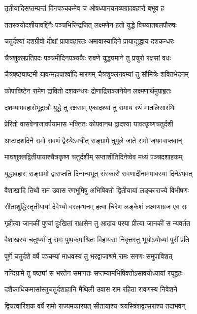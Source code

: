 \twolineshloka
{तृतीयादिसप्तम्यन्तं दिनपञ्चकमेव च}
{ओषध्यानयनव्यग्रादवहारो बभूव ह}%

\twolineshloka
{ततस्त्रयोदशीयावद्दिनैः पञ्चभिरिन्द्रजित्}
{लक्ष्मणेन हतो युद्धे विख्यातबलपौरुषः}%

\twolineshloka
{चतुर्दश्यां दशग्रीवो दीक्षां प्रापावहारतः}
{अमावास्यादिने प्रायाद्युद्धाय दशकन्धरः}%

\twolineshloka
{चैत्रशुक्लप्रतिपदः पञ्चमीदिनपञ्चकैः}
{रावणे युद्ध्यमाने तु प्रचुरो रक्षसां वधः}%

\twolineshloka
{चैत्रषष्ठ्याष्टमी यावन्महापार्श्वादि मारणम्}
{चैत्रशुक्लनवम्यां तु सौमित्रेः शक्तिभेदनम्}%

\twolineshloka
{कोपाविष्टेन रामेण द्रावितो दशकन्धरः}
{द्रोणाद्रिराञ्जनेयेन लक्ष्मणार्थमुपाहृतः}%

\twolineshloka
{दशम्यामवहारोभूद्रात्रौ युद्धे तु रक्षसाम्}
{एकादश्यां तु रामाय रथं मातलिसारथिः}%

\twolineshloka
{प्रेरितो वासवेनाजावर्पयामास भक्तितः}
{कोपवानथ द्वादश्या यावत्कृष्णचतुर्दशी}%

\twolineshloka
{अष्टादशदिनै रामो रावणं द्वैरथेऽवधीत्}
{सङ्ग्रामे तुमुले जाते रामो जयमवाप्तवान्}%

\twolineshloka
{माघशुक्लद्वितीयायाश्चैत्रकृष्ण चतुर्दशीम्}
{सप्ताशीतिदिनेष्वेव मध्यं पञ्चदशाहकम्}%

\twolineshloka
{युद्धावहारः सङ्ग्रामो द्वासप्तति दिनान्यभूत्}
{संस्कारो रावणादीनाममावस्या दिनेऽभवत्}%

\twolineshloka
{वैशाखादि तिथौ राम उवास रणभूमिषु}
{अभिषिक्तो द्वितीयायां लङ्काराज्ये विभीषणः}%

\twolineshloka
{सीताशुद्धिस्तृतीयायां देवेभ्यो वरलम्भनम्}
{हत्वा चिरेण लङ्केशं लक्ष्मणाग्रज एव सः}%

\twolineshloka
{गृहीत्वा जानकीं पुण्यां दुःखितां राक्षसेन तु}
{आदाय परया प्रीत्या जानकीं स न्यवर्तत}%

\twolineshloka
{वैशाखस्य चतुर्थ्यां तु रामः पुष्पकमाश्रितः}
{विहायसा निवृत्तस्तु भूयोऽयोध्यां पुरीं प्रति}%

\twolineshloka
{पूर्णे चतुर्दशे वर्षे पञ्चम्यां माधवस्य तु}
{भरद्वाजाश्रमे रामः सगणः समुपाविशत्}%

\twolineshloka
{नन्दिग्रामे तु षष्ठ्यां स भरतेन समागतः}
{सप्तम्यामभिषिक्तोऽसावयोध्यायां रघूद्वहः}%

\twolineshloka
{दशैकाधिकमासांस्तुचतुर्दशाहानि मैथिली}
{उवास राम रहिता रावणस्य निवेशने}%

\twolineshloka
{द्विचत्वारिंशक वर्षे रामो राज्यमकारयत्}
{सीतायाश्च त्रयस्त्रिंशद्वत्सराश्च तदाभवन्}%

